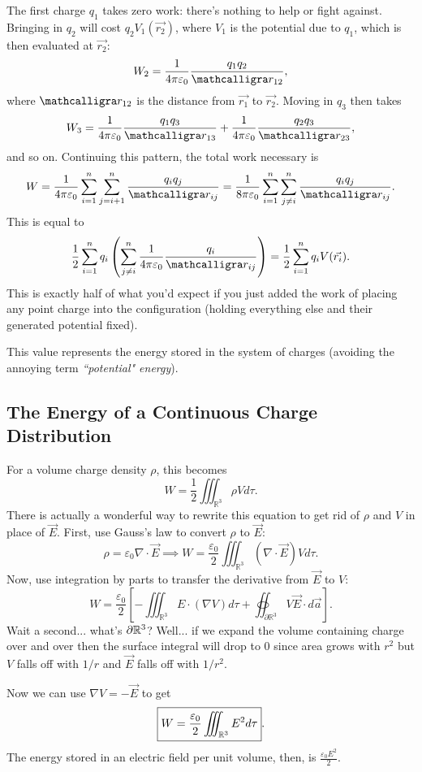 The first charge $q_1$ takes zero work: there's nothing to help or fight against. Bringing in $q_2$ will cost $q_2V_1(\vec{r_2})$, where $V_1$ is the potential due to $q_1$, which is then evaluated at $\vec{r_2}$:
\[W_2=\frac{1}{4\pi \varepsilon_0}\frac{q_1q_2}{\scr_{12}},\]
where $\scr_{12}$ is the distance from $\vec{r_1}$ to $\vec{r_2}$. Moving in $q_3$ then takes
\[W_3=\frac{1}{4\pi\varepsilon_0}\frac{q_1q_3}{\scr_{13}}+\frac{1}{4\pi\varepsilon_0}\frac{q_2q_3}{\scr_{23}},\]
and so on. Continuing this pattern, the total work necessary is
\[W=\frac{1}{4\pi \varepsilon_0}\sum_{i=1}^n\sum_{j=i+1}^n\frac{q_iq_j}{\scr_{ij}}=\frac{1}{8\pi\varepsilon_0}\sum_{i=1}^n\sum_{j\neq i}^n\frac{q_iq_j}{\scr_{ij}}.\]
This is equal to
\begin{equation}\label{pointchargeenergy}
\frac{1}{2}\sum_{i=1}^nq_i\left(\sum_{j\neq i}^n\frac{1}{4\pi\varepsilon_0}\frac{q_i}{\scr_{ij}}\right)=\frac{1}{2}\sum_{i=1}^nq_iV(\vec{r_i}).
\end{equation}
This is exactly half of what you'd expect if you just added the work of placing any point charge into the configuration (holding everything else and their generated potential fixed).

This value represents the energy stored in the system of charges (avoiding the annoying term \textit{``potential" energy}).

\subsection{The Energy of a Continuous Charge Distribution}\label{energyinfield}

For a volume charge density $\rho$, this becomes
\[W=\frac{1}{2}\iiint_{\mathbb{R}^3}\rho Vd\tau.\]
There is actually a wonderful way to rewrite this equation to get rid of $\rho$ and $V$ in place of $\vec{E}$. First, use Gauss's law to convert $\rho$ to $\vec{E}$:
\[\rho=\varepsilon_0
\nabla\cdot \vec{E}\implies W=\frac{\varepsilon_0}{2}\iiint_{\mathbb{R}^3}(\nabla\cdot \vec{E})Vd\tau.\]
Now, use integration by parts to transfer the derivative from $\vec{E}$ to $V$:
\[W=\frac{\varepsilon_0}{2}\left[-\iiint_{\mathbb{R}^3}E\cdot(\nabla V)d\tau+\oiint_{\partial \mathbb{R}^3}V\vec{E}\cdot d\vec{a}\right].\]
Wait a second... what's $\partial \mathbb R^3$? Well... if we expand the volume containing charge over and over then the surface integral will drop to $0$ since area grows with $r^2$ but $V$ falls off with $1/r$ and $\vec{E}$ falls off with $1/r^2$.

Now we can use $\nabla V=-\vec{E}$ to get
\begin{equation}\label{energyelectric}
\boxed{W=\frac{\varepsilon_0}{2}\iiint_{\mathbb R^3}E^2d\tau}.
\end{equation}
The energy stored in an electric field per unit volume, then, is $\frac{\varepsilon_0E^2}{2}$.

